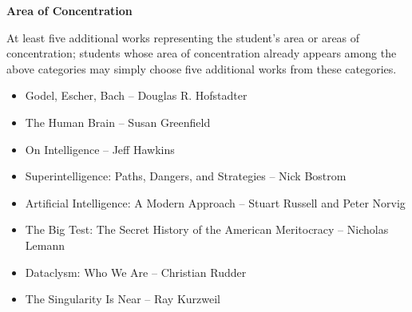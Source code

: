 \documentclass[11pt]{article}
\begin{document}
\par \textbf{Area of Concentration}
\par At least five additional works representing the student's area or areas of concentration; students whose area of concentration already appears among the above categories may simply choose five additional works from these categories.
\begin{itemize}
	\item Godel, Escher, Bach -- Douglas R. Hofstadter
	\item The Human Brain -- Susan Greenfield
	\item On Intelligence -- Jeff Hawkins
	\item Superintelligence: Paths, Dangers, and Strategies -- Nick Bostrom
	\item Artificial Intelligence: A Modern Approach -- Stuart Russell and Peter Norvig
	\item The Big Test: The Secret History of the American Meritocracy -- Nicholas Lemann
	\item Dataclysm: Who We Are -- Christian Rudder
	\item The Singularity Is Near -- Ray Kurzweil
\end{itemize}
\end{document}

